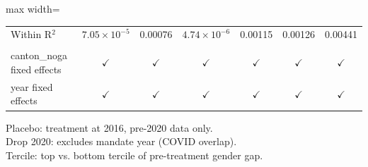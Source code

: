\begin{table}[htbp]
\begin{adjustbox}{max width=\textwidth}
\begin{tabular}{lcccccc}
      Within R$^2$                & $7.05\times 10^{-5}$              & 0.00076                             & $4.74\times 10^{-6}$              & 0.00115                             & 0.00126                           & 0.00441\\  
       \\
      canton\_noga fixed effects  & $\checkmark$                      & $\checkmark$                        & $\checkmark$                      & $\checkmark$                        & $\checkmark$                      & $\checkmark$\\   
      year fixed effects          & $\checkmark$                      & $\checkmark$                        & $\checkmark$                      & $\checkmark$                        & $\checkmark$                      & $\checkmark$\\   
      \bottomrule
   \end{tabular}
   \end{adjustbox}

   \par \raggedright
   Placebo: treatment at 2016, pre-2020 data only.\\
   Drop 2020: excludes mandate year (COVID overlap).\\
   Tercile: top vs. bottom tercile of pre-treatment gender gap.
\end{table}


